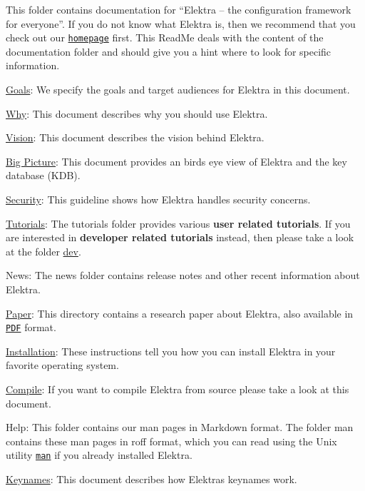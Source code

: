 This folder contains documentation for “\+Elektra – the configuration framework for everyone”. If you do not know what Elektra is, then we recommend that you check out our \href{https://www.libelektra.org/home}{\tt homepage} first. This Read\+Me deals with the content of the documentation folder and should give you a hint where to look for specific information.


\begin{DoxyItemize}
\item \hyperlink{doc_GOALS_md}{Goals}\+: We specify the goals and target audiences for Elektra in this document.
\item \hyperlink{doc_WHY_md}{Why}\+: This document describes why you should use Elektra.
\item \hyperlink{doc_VISION_md}{Vision}\+: This document describes the vision behind Elektra.
\item \hyperlink{doc_BIGPICTURE_md}{Big Picture}\+: This document provides an birds eye view of Elektra and the key database (K\+DB).
\item \hyperlink{doc_SECURITY_md}{Security}\+: This guideline shows how Elektra handles security concerns.
\item \hyperlink{md_doc_tutorials_README_doc_tutorials_README_md}{Tutorials}\+: The tutorials folder provides various {\bfseries user related tutorials}. If you are interested in {\bfseries developer related tutorials} instead, then please take a look at the folder \hyperlink{md_doc_dev_README_doc_dev_README_md}{dev}.
\item News\+: The news folder contains release notes and other recent information about Elektra.
\item \hyperlink{doc_paper_README_md}{Paper}\+: This directory contains a research paper about Elektra, also available in \href{http://joss.theoj.org/papers/10.21105/joss.00044}{\tt P\+DF} format.
\end{DoxyItemize}


\begin{DoxyItemize}
\item \hyperlink{doc_INSTALL_md}{Installation}\+: These instructions tell you how you can install Elektra in your favorite operating system.
\item \hyperlink{doc_COMPILE_md}{Compile}\+: If you want to compile Elektra from source please take a look at this document.
\item Help\+: This folder contains our man pages in Markdown format. The folder man contains these man pages in roff format, which you can read using the Unix utility \href{https://en.wikipedia.org/wiki/Man_page}{\tt {\ttfamily man}} if you already installed Elektra.
\item \hyperlink{doc_KEYNAMES_md}{Keynames}\+: This document describes how Elektra\textquotesingle{}s keynames work.
\end{DoxyItemize}


